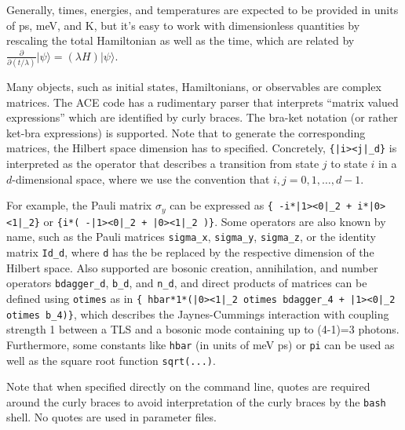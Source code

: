 \documentclass{scrartcl}
\begin{document}
Generally, times, energies, and temperatures are expected to be provided
in units of ps, meV, and K, but it's easy to work with dimensionless 
quantities by rescaling the total Hamiltonian as well as the time, which 
are related by
$\frac{\partial}{\partial (t/\lambda)} |\psi\rangle = (\lambda H) |\psi\rangle$.

Many objects, such as initial states, Hamiltonians, or observables are
complex matrices. The ACE code has a rudimentary parser that interprets 
``matrix valued expressions'' which are identified by curly braces.
The bra-ket notation (or rather ket-bra expressions) is supported. 
Note that to generate the corresponding matrices, the Hilbert space dimension 
has to specified. Concretely, \verb+{|i><j|_d}+ is interpreted as the 
operator that describes a transition from state $j$ to state $i$ in a 
$d$-dimensional space, where we use the convention that $i,j=0,1,\dots, d-1$.

For example, the Pauli matrix $\sigma_y$ can be expressed as
\verb#{ -i*|1><0|_2 + i*|0><1|_2}# or 
\verb#{i*( -|1><0|_2 + |0><1|_2 )}#.
Some operators are also known by name, such as the Pauli matrices 
\verb+sigma_x+, \verb+sigma_y+, \verb+sigma_z+, or the identity matrix 
\verb+Id_d+, where \texttt{d} has the be replaced by the respective dimension 
of the Hilbert space. Also supported are bosonic creation, annihilation, and
number operators \verb+bdagger_d+, \verb+b_d+, and \verb+n_d+, and direct 
products of matrices can be defined using \verb+otimes+ as in 
\verb#{ hbar*1*(|0><1|_2 otimes bdagger_4 + |1><0|_2 otimes b_4)}#,
which describes the Jaynes-Cummings interaction with coupling strength 1 
between a TLS and a bosonic mode containing up to (4-1)=3 photons.
Furthermore, some constants like \texttt{hbar} 
(in units of meV ps) or \texttt{pi} can be used as well as the square root
function \texttt{sqrt(...)}.


Note that when specified directly on the command line, 
quotes are required around the curly braces to avoid interpretation 
of the curly braces by the \texttt{bash} shell. No quotes are used in 
parameter files.
\end{document}
